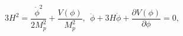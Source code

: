 \begin{equation}
\label{3eq4}
3 H^2= \frac{\dot \phi^2}{2 M_p^2} +\frac{V(\phi)}{M_p^2},~~
\ddot \phi+ 3 H \dot \phi + \frac{\partial V(\phi)}{\partial \phi}=0,
\end{equation}

